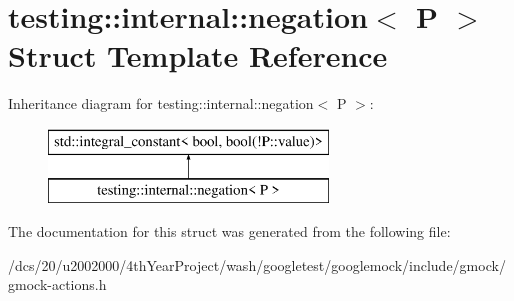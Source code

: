 \hypertarget{structtesting_1_1internal_1_1negation}{}\section{testing\+:\+:internal\+:\+:negation$<$ P $>$ Struct Template Reference}
\label{structtesting_1_1internal_1_1negation}
Inheritance diagram for testing\+:\+:internal\+:\+:negation$<$ P $>$\+:\begin{figure}[H]
\begin{center}
\leavevmode
\includegraphics[height=2.000000cm]{structtesting_1_1internal_1_1negation}
\end{center}
\end{figure}


The documentation for this struct was generated from the following file\+:\begin{DoxyCompactItemize}
\item 
/dcs/20/u2002000/4th\+Year\+Project/wash/googletest/googlemock/include/gmock/gmock-\/actions.\+h\end{DoxyCompactItemize}
